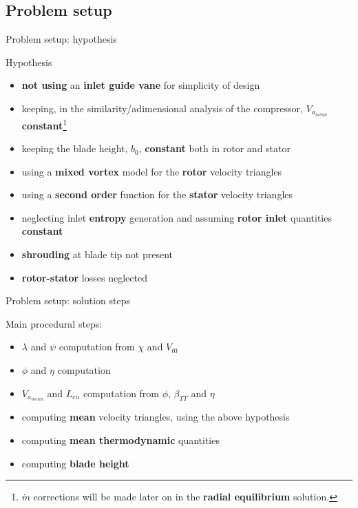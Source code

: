 \subsection{Problem setup}
	{\nologo
	\begin{frame}{Problem setup: hypothesis}
		\begin{alertblock}{Hypothesis}
			\begin{itemize}
				\item \textbf{not using} an \textbf{inlet guide vane} for simplicity of design
				\item keeping, in the similarity/adimensional analysis of the compressor, $V_{a_{mean}}$ \textbf{constant}\footnote{$\dot{m}$ corrections will be made later on in the \textbf{radial equilibrium} solution.}  
				\item keeping the blade height, $b_0$, \textbf{constant} both in rotor and stator
				\item using a \textbf{mixed vortex} model for the \textbf{rotor} velocity triangles
				\item using a \textbf{second order} function for the \textbf{stator} velocity triangles 
				\item neglecting inlet \textbf{entropy} generation and assuming \textbf{rotor inlet} quantities \textbf{constant}
				\item \textbf{shrouding} at blade tip not present
				\item \textbf{rotor-stator} losses neglected
			\end{itemize}
		\end{alertblock}
	\end{frame}
	}
	
	\begin{frame}{Problem setup: solution steps}
		\begin{block}{Main procedural steps:}
			\begin{itemize}
				\item $\lambda$ and $\psi$ computation from $\chi$ and $V_{t0}$
				\item $\phi$ and $\eta$ computation 
				\item $V_{a_{mean}}$ and $L_{eu}$ computation from $\phi$, $\beta_{TT}$ and $\eta$
				\item computing \textbf{mean} velocity triangles, using the above hypothesis
				\item computing \textbf{mean thermodynamic} quantities 
				\item computing \textbf{blade height}
			\end{itemize}
		\end{block}
	\end{frame}

